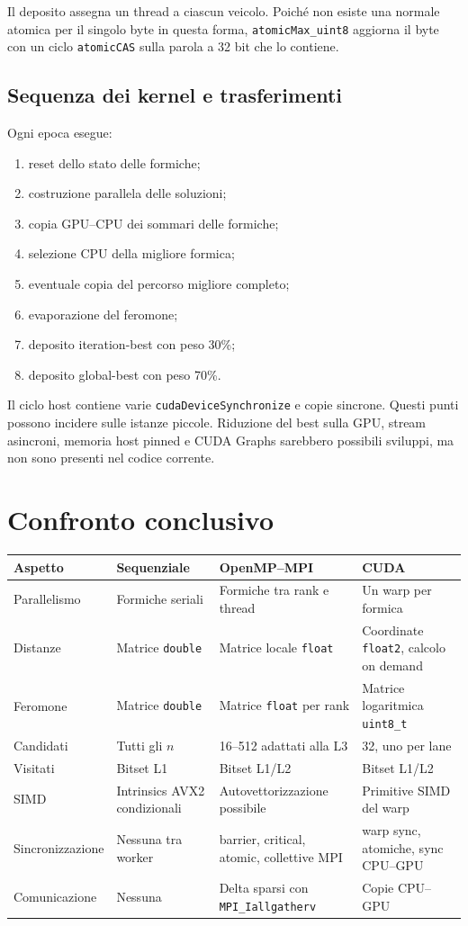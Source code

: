 \documentclass[11pt,a4paper]{article}
\begin{document}
Il deposito assegna un thread a ciascun veicolo. Poiché non esiste una normale
atomica per il singolo byte in questa forma, \texttt{atomicMax\_uint8} aggiorna
il byte con un ciclo \texttt{atomicCAS} sulla parola a 32 bit che lo contiene.

\subsection{Sequenza dei kernel e trasferimenti}

Ogni epoca esegue:
\begin{enumerate}
  \item reset dello stato delle formiche;
  \item costruzione parallela delle soluzioni;
  \item copia GPU--CPU dei sommari delle formiche;
  \item selezione CPU della migliore formica;
  \item eventuale copia del percorso migliore completo;
  \item evaporazione del feromone;
  \item deposito iteration-best con peso 30\%;
  \item deposito global-best con peso 70\%.
\end{enumerate}

Il ciclo host contiene varie \texttt{cudaDeviceSynchronize} e copie sincrone.
Questi punti possono incidere sulle istanze piccole. Riduzione del best sulla GPU,
stream asincroni, memoria host pinned e CUDA Graphs sarebbero possibili sviluppi,
ma non sono presenti nel codice corrente.

\section{Confronto conclusivo}

\small
\begin{tabularx}{\textwidth}{@{}lXXX@{}}
\toprule
\textbf{Aspetto} & \textbf{Sequenziale} & \textbf{OpenMP--MPI} & \textbf{CUDA}\\
\midrule
Parallelismo & Formiche seriali & Formiche tra rank e thread & Un warp per formica\\
Distanze & Matrice \texttt{double} & Matrice locale \texttt{float} & Coordinate \texttt{float2}, calcolo on demand\\
Feromone & Matrice \texttt{double} & Matrice \texttt{float} per rank & Matrice logaritmica \texttt{uint8\_t}\\
Candidati & Tutti gli $n$ & 16--512 adattati alla L3 & 32, uno per lane\\
Visitati & Bitset L1 & Bitset L1/L2 & Bitset L1/L2\\
SIMD & Intrinsics AVX2 condizionali & Autovettorizzazione possibile & Primitive SIMD del warp\\
Sincronizzazione & Nessuna tra worker & barrier, critical, atomic, collettive MPI & warp sync, atomiche, sync CPU--GPU\\
Comunicazione & Nessuna & Delta sparsi con \texttt{MPI\_Iallgatherv} & Copie CPU--GPU\\
\bottomrule
\end{tabularx}
\normalsize
\end{document}
